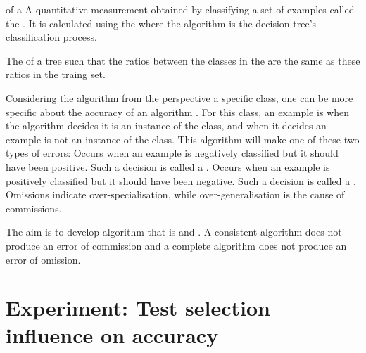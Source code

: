  {of a } {A quantitative measurement obtained by classifying a set of examples called the . It is calculated using the \newline {} where the algorithm is the decision tree's classification process.}  

 {The  of a tree such that the ratios between the classes in the   are the same as these ratios in the traing set. }  

Considering the algorithm from the perspective a specific class, one can be more specific about the accuracy of an algorithm \cite{kubat:review}. For this class, an example is  when the algorithm decides it is an instance of the class, and  when it decides an example is not an instance of the class. This algorithm will make one of these two types of errors:
 {Occurs when an example is negatively classified but it should have been positive.  Such a decision is called a .}
 {Occurs when an example is positively classified but it should have been negative.  Such a decision is called a .}
Omissions indicate over-specialisation, while over-generalisation is the cause of commissions. 

The aim is to develop algorithm that is  and . A consistent algorithm does not produce an error of commission and a complete algorithm does not produce an error of omission.   



\section{Experiment: Test selection influence on accuracy} %
\label{sec:c4-025}
